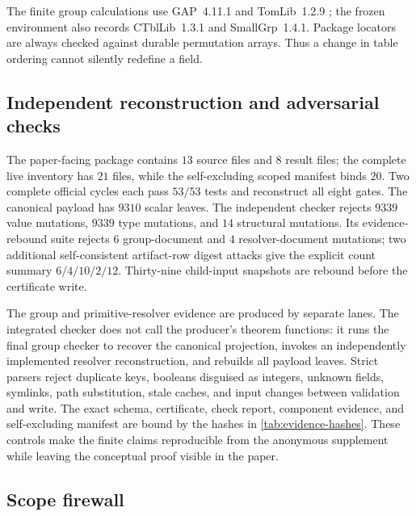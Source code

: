 The finite group calculations use GAP~4.11.1 and TomLib~1.2.9
\citep{gap2021,tomlib2019}; the frozen environment also records CTblLib~1.3.1
and SmallGrp~1.4.1.  Package locators are always checked against durable
permutation arrays.  Thus a change in table ordering cannot silently redefine
a field.

\subsection{Independent reconstruction and adversarial checks}

The paper-facing package contains $13$ source files and $8$ result files;
the complete live inventory has $21$ files, while the self-excluding scoped
manifest binds $20$.  Two complete official cycles each pass $53/53$ tests
and reconstruct all eight gates.  The canonical payload has $9310$ scalar
leaves.  The independent checker rejects $9339$ value mutations, $9339$ type
mutations, and $14$ structural mutations.  Its evidence-rebound suite rejects
$6$ group-document and $4$ resolver-document mutations; two additional
self-consistent artifact-row digest attacks give the explicit count summary
$6/4/10/2/12$.  Thirty-nine child-input snapshots are rebound before the
certificate write.

The group and primitive-resolver evidence are produced by separate lanes.
The integrated checker does not call the producer's theorem functions: it
runs the final group checker to recover the canonical projection, invokes an
independently implemented resolver reconstruction, and rebuilds all payload
leaves.  Strict parsers reject duplicate keys, booleans disguised as integers,
unknown fields, symlinks, path substitution, stale caches, and input changes
between validation and write.  The exact schema, certificate, check report,
component evidence, and self-excluding manifest are bound by the hashes in
\cref{tab:evidence-hashes}.  These controls make the finite claims
reproducible from the anonymous supplement while leaving the conceptual proof
visible in the paper.

\subsection{Scope firewall}

